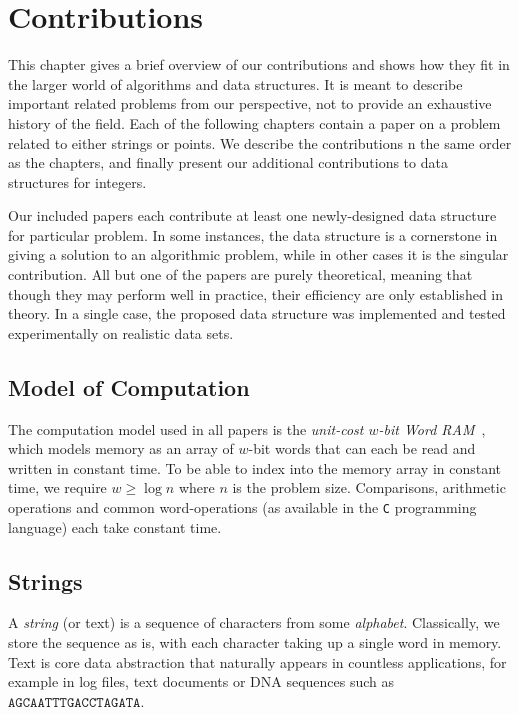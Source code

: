 \chapter{Contributions}\label{chp:contributions}
This chapter gives a brief overview of our contributions and shows how they fit in the larger world of algorithms and data structures. It is meant to describe important related problems from our perspective, not to provide an exhaustive history of the field. Each of the following chapters contain a paper on a problem related to either strings or points. We describe the contributions n the same order as the chapters, and finally present our additional contributions to data structures for integers.

Our included papers each contribute at least one newly-designed data structure for particular problem. In some instances, the data structure is a cornerstone in giving a solution to an algorithmic problem, while in other cases it is the singular contribution. All but one of the papers are purely theoretical, meaning that though they may perform well in practice, their efficiency are only established in theory. In a single case, the proposed data structure was implemented and tested experimentally on realistic data sets.



\section{Model of Computation}
The computation model used in all papers is the \emph{unit-cost $w$-bit Word RAM}~\cite{Hagerup1998}, which models memory as an array of $w$-bit words that can each be read and written in constant time. To be able to index into the memory array in constant time, we require $w \geq \log n$ where $n$ is the problem size. Comparisons, arithmetic operations and common word-operations (as available in the \texttt{C} programming language) each take constant time. 

\section{Strings}
A \emph{string} (or text) is a sequence of characters from some \emph{alphabet}. Classically, we store the sequence as is, with each character taking up a single word in memory. Text is core data abstraction that naturally appears in countless applications, for example in log files, text documents or DNA sequences such as $\mathtt{AGCAATTTGACCTAGATA}$. 

